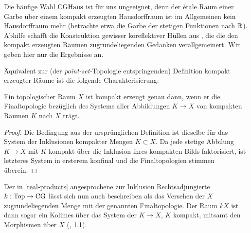Die häufige Wahl $\operatorname{CGHaus}$ ist für uns ungeeignet, denn der étale Raum
einer Garbe über einem kompakt erzeugten Hausdorffraum ist im
Allgemeinen kein Hausdorffraum mehr (betrachte etwa die Garbe der
stetigen Funktionen nach $\mathbb{R}$). Abhilfe schafft die Konstruktion
gewisser koreflektiver Hüllen aus \cite{Vogt}, die die den kompakt
erzeugten Räumen zugrundeliegenden Gedanken verallgemeinert. Wir geben
hier nur die Ergebnisse an.

Äquivalent zur (der \emph{point-set-}Topologie entspringenden)
Definition kompakt erzeugter Räume ist die folgende Charakterisierung:
\begin{lemma}
  Ein topologischer Raum $X$ ist kompakt erzeugt genau dann, wenn er
  die Finaltopologie bezüglich des Systems aller Abbildungen $K \to X$
  von kompakten Räumen $K$ nach $X$ trägt.
\end{lemma}
\begin{proof}
  Die Bedingung aus der ursprünglichen Definition ist dieselbe für das
  System der Inklusionen kompakter Mengen $K \subset X$. Da jede
  stetige Abbilung $K \to X$ mit $K$ kompakt über die Inklusion ihres
  kompakten Bilds faktorisiert, ist letzteres System in ersterem
  konfinal und die Finaltopologien stimmen überein.
\end{proof}
Der in \ref{real-products} angesprochene zur Inklusion
Rechtsadjungierte $k: \operatorname{Top} \to \operatorname{CG}$ lässt sich nun auch beschreiben
als das Versehen der $X$ zugrundeliegenden Menge mit der genannten
Finaltopologie. Der Raum $kX$ ist dann sogar ein Kolimes über das
System der $K \to X$, $K$ kompakt, mitsamt den Morphismen über $X$
(\cite{Vogt}, 1.1).

